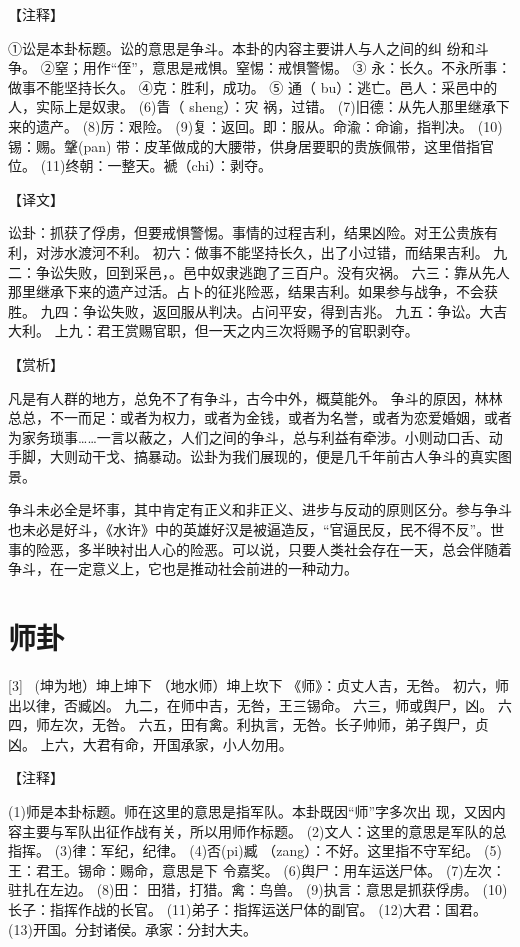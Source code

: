 \documentclass[12pt,UTF8]{ctexbook}
\begin{document}
【注释】

①讼是本卦标题。讼的意思是争斗。本卦的内容主要讲人与人之间的纠 纷和斗争。
②窒；用作“侄”，意思是戒惧。窒惕：戒惧警惕。
③ 永：长久。不永所事：做事不能坚持长久。
④克：胜利，成功。
⑤ 通（ bu）：逃亡。邑人：采邑中的人，实际上是奴隶。
(6)眚（ sheng）：灾 祸，过错。
(7)旧德：从先人那里继承下来的遗产。
(8)厉：艰险。
(9)复：返回。即：服从。命渝：命谕，指判决。
(10)锡：赐。鞶(pan) 带：皮革做成的大腰带，供身居要职的贵族佩带，这里借指官位。
(11)终朝：一整天。褫（chi）：剥夺。

【译文】

讼卦：抓获了俘虏，但要戒惧警惕。事情的过程吉利，结果凶险。对王公贵族有利，对涉水渡河不利。
初六：做事不能坚持长久，出了小过错，而结果吉利。
九二：争讼失败，回到采邑，。邑中奴隶逃跑了三百户。没有灾祸。
六三：靠从先人那里继承下来的遗产过活。占卜的征兆险恶，结果吉利。如果参与战争，不会获胜。
九四：争讼失败，返回服从判决。占问平安，得到吉兆。
九五：争讼。大吉大利。
上九：君王赏赐官职，但一天之内三次将赐予的官职剥夺。

【赏析】

凡是有人群的地方，总免不了有争斗，古今中外，概莫能外。 争斗的原因，林林总总，不一而足：或者为权力，或者为金钱，或者为名誉，或者为恋爱婚姻，或者为家务琐事……一言以蔽之，人们之间的争斗，总与利益有牵涉。小则动口舌、动手脚，大则动干戈、搞暴动。讼卦为我们展现的，便是几千年前古人争斗的真实图景。

争斗未必全是坏事，其中肯定有正义和非正义、进步与反动的原则区分。参与争斗也未必是好斗，《水许》中的英雄好汉是被逼造反，“官逼民反，民不得不反”。世事的险恶，多半映衬出人心的险恶。可以说，只要人类社会存在一天，总会伴随着争斗，在一定意义上，它也是推动社会前进的一种动力。

\chapter{师卦}
[3] \ (坤为地）坤上坤下
（地水师）坤上坎下
《师》：贞丈人吉，无咎。
初六，师出以律，否臧凶。
九二，在师中吉，无咎，王三锡命。
六三，师或舆尸，凶。
六四，师左次，无咎。
六五，田有禽。利执言，无咎。长子帅师，弟子舆尸，贞凶。
上六，大君有命，开国承家，小人勿用。

【注释】

(1)师是本卦标题。师在这里的意思是指军队。本卦既因“师”字多次出 现，又因内容主要与军队出征作战有关，所以用师作标题。
(2)文人：这里的意思是军队的总指挥。
(3)律：军纪，纪律。
(4)否(pi)臧 （zang）：不好。这里指不守军纪。
(5)王：君王。锡命：赐命，意思是下 令嘉奖。
(6)舆尸：用车运送尸体。
(7)左次：驻扎在左边。
(8)田： 田猎，打猎。禽：鸟兽。
(9)执言：意思是抓获俘虏。
(10)长子：指挥作战的长官。
(11)弟子：指挥运送尸体的副官。
(12)大君：国君。
(13)开国。分封诸侯。承家：分封大夫。
\end{document}
